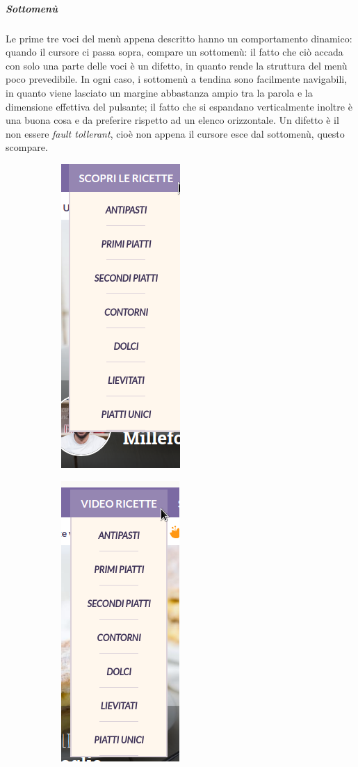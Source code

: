 \subparagraph{Sottomenù}

Le prime tre voci del menù appena descritto hanno un comportamento dinamico: quando il cursore ci passa sopra, compare un sottomenù: il fatto che ciò accada con solo una parte delle voci è un difetto, in quanto rende la struttura del menù poco prevedibile. In ogni caso, i sottomenù a tendina sono facilmente navigabili, in quanto viene lasciato un margine abbastanza ampio tra la parola e la dimensione effettiva del pulsante; il fatto che si espandano verticalmente inoltre è una buona cosa e da preferire rispetto ad un elenco orizzontale. Un difetto è il non essere \textit{fault tollerant}, cioè non appena il cursore esce dal sottomenù, questo scompare.


\begin{figure}[h!]
	\centering
	\begin{subfigure}[b]{0.3\textwidth}
		\includegraphics[scale=0.5]{images/sottomenu-1.png}
		\subcaption{}
	\end{subfigure}
	\begin{subfigure}[b]{0.3\textwidth}
		\includegraphics[scale=0.5]{images/sottomenu-2.png}

\end{subfigure}
\end{figure}
